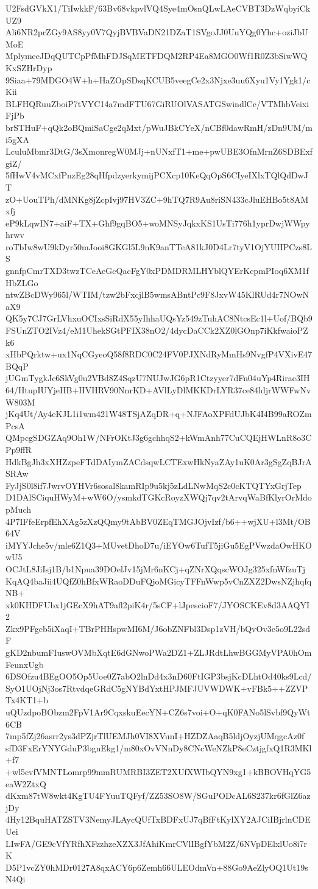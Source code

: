 U2FsdGVkX1/TiIwkkF/63Bv68vkpvlVQ4Sye4mOsnQLwLAeCVBT3DzWqbyiCkUZ9
Ali6NR2prZGy9AS8yy0V7QyjBVBVaDN21DZaT1SVgoJJ0UuYQg0Yhc+oziJbUMoE
MplymeeJDqQUTCpPfMhFDJSqMETFDQM2RP4Ea8MGO0Wf1R0Z3bSiwWQKxSZHrDyp
9Siaa+79MDGO4W+h+HaZOpSDsqKCUB5veegCe2x3Njxe3uu6Xyu1Vy1Ygk1/cKii
BLFHQRuuZboiP7tVYC14a7mdFTU67GiRUOlVASATGSwindlCc/VTMhbVeixiFjPb
brSTHuF+qQk2oBQmiSaCge2qMxt/pWuJBkCYeX/nCBf0dawRmH/zDn9UM/mi5gXA
LculuMbmr3DtG/3sXmonregW0MJj+nUNxfT1+me+pwUBE3OfnMrnZ6SDBExfgiZ/
5fHwV4vMCxfPnzEg28qHfpdzyerkymijPCXcp10KeQqOpS6CIyeIXlxTQlQdDwJT
zO+UouTPh/dMNKg8jZcpIvj97HV3ZC+9hTQ7R9Au8riSN433cJluEHBo5t8AMxfj
eP9kLqwIN7+aiF+TX+Ghf9gqBO5+woMNSyJqkxKS1UsTi776h1yprDwjWWpyhrwv
roTbIw8wU9kDyr50mJooi8GKGl5L9nK9anTTeA81kJ0D4Lr7tyV1OjYUHPCzs8LS
gnnfpCmrTXD3twzTCeAeGcQacFgY0xPDMDRMLHYblQYErKcpmPIoq6XM1fHbZLGo
ntwZBcDWy965l/WTIM/tzw2bFxcjlB5wmsABntPc9F8JxvW45KlRUd4r7NOwNaX9
QK5y7CJ7GrLVhxuOCIxsSiRdX55yIhhaUQsYz549zTuhAC8NtcsEc1l+Uof/BQb9
FSUnZTO2IVz4/eM1UhekSGtPFIX38nO2/4dycDaCCk2XZ0lGOnp7iKkfwaioPZk6
xHbPQrktw+ux1NqCGyeoQ58f8RDC0C24FV0PJXNdRyMmHs9NvgfP4VXivE47BQqP
jUGmTygkJc6SkVg0u2VBd8Z4SqzU7NUJwJG6pR1Ctzyyer7dFn04uYp4Rirae3IH
64/HtupIUYjeHB+HVHRV90NnrKD+AVlLyDlMKKDrLYR37ce84ldjrWWFwNvW803M
jKq4Ut/Ay4eKJL1i1wm421W48TSjAZqDR+q+NJFAoXPFdUJbK4I4B99aROZmPcsA
QMpcgSDGZAq9Oh1W/NFrOKtJ3g6gchhqS2+kWmAnh77CuCQEjHWLnR8o3CPp9ffR
HdkBgJh3xXHZzpeFTdDAIymZACdsqwLCTExwHkNyaZAy1uK0Ar3gSgZqBJrASRAw
FyJjS0l8if7JwrvOYHVr6sosal8kamRIp9u5kj5zLdLNwMqS2c0cKTQTYxGrjTep
D1DAlSCiquHWyM+wW6O/ysmkdTGKcRoyzXWQj7qv2tArvqWaBfKlyrOrMdopMuch
4P7IFfeErpfEhXAg5zXzQQmy9tAbBV0ZEqTMGJOjvIzf/b6++wjXU+l3Mt/OB64V
iMYYJche5v/mle6Z1Q3+MUvetDhoD7u/iEYOw6TufT5jiGu5EgPVwzdaOwHKOwU5
OCJtL8JiIsj1B/b1Npua39DOelJv15jMr6nKCj+qZNrXQqscWOJg325xfnWfzuTj
KqAQ4baJii4UQfZ0hBfxWRaoDDuFQjoMGicyTFFnWwp5vCnZXZ2DwsNZjhqfqNB+
xk0KHDFUbx1jGEcX9hAT9afl2piK4r/5sCF+lJpescioF7/JYOSCKEv8d3AAQYI2
Zkx9PFgcb5iXaqI+TBrPHHspwMI6M/J6obZNFbl3Dsp1zVH/bQvOv3e5o9L22sdF
gKD2nbumFIuswOVMbXqtE6dGNwoPWa2DZ1+ZLJRdtLhwBGGMyVPA0hOmFeunxUgb
6DSOfzu4BEgOO5Op5Uoe0Z7abO2lnDd4x3nD60FtIGP3bsjKcDLhtOd40ks9Lcd/
SyO1UOjNj3os7RtvdqeGRdC5gNYBdYxtHPJMFJUVWDWK+vFBk5++ZZVPTx4KT1+b
uQUzdpoBObzm2FpV1Ar9CqxskuEecYN+CZ6s7voi+O+qK0FANo5lSvbf9QyWt6CB
7mp5fZj26asrr2ys3dPZjrTlUEMJh0VI8XVunI+HZDZAaqB5ldjOyzjUMqgcAz0f
sfD3FxErYNYGduP3bgnEkg1/m80xOvVNnDy8CNcWeNZkP8eCztjgfxQ1R3MKl+f7
+wl5cvfVMNTLomrp99mmRUMRBI3ZET2XUfXWIbQYN9xg1+kBBOVHqYG5eaW2ZtxQ
dKxm87tW8wkt4KgTU4FYuuTQFyf/ZZ53SO8W/SGuPODcAL6S237kr6fGlZ6azjDy
4Hy12BquHATZSTV3NemyJLAycQUfTxBDFxUJ7qBfFtKylXY2AJCiIBjrlnCDEUei
LIwFA/GE9cVfYRfhXFzzhzeXZX3JfAhiKmrCVlIBgfYbM2Z/6NVpDElxlUo8i7rK
D5P1vcZY0hMDr0127A8qxACY6p6Zemh66ULEOdmVn+88Go9AeZlyOQ1Ut19sN4Qi
